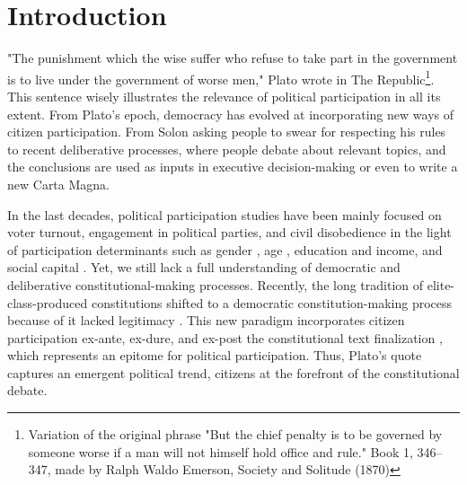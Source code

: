 \documentclass[onecolumn]{article}
\begin{document}


\maketitle

\section*{Introduction}
\label{sec:intro}

"The punishment which the wise suffer who refuse to take part in the government is to live under the government of worse men," Plato wrote in The Republic\footnote{Variation of the original phrase "But the chief penalty is to be governed by someone worse if a man will not himself hold office and rule." Book 1, 346–347, made by Ralph Waldo Emerson, Society and Solitude (1870)}. This sentence wisely illustrates the relevance of political participation in all its extent. From Plato's epoch, democracy has evolved at incorporating new ways of citizen participation. From Solon asking people to swear for respecting his rules to recent deliberative processes, where people debate about relevant topics, and the conclusions are used as inputs in executive decision-making or even to write a new Carta Magna. 

In the last decades, political participation studies have been mainly focused on voter turnout, engagement in political parties, and civil disobedience in the light of participation determinants such as gender \cite{pachon2012, schlozman1999, pnud}, age \cite{wolfinger1980, highton2001, contreras}, education and income\cite{pnud,verba, corvalan}, and social capital \cite{coleman1988, ladua, klesner, bargsted, mccull, campbell, muller1970, hofferth}. Yet, we still lack a full understanding of democratic and deliberative constitutional-making processes. Recently, the long tradition of elite-class-produced constitutions shifted to a democratic constitution-making process because of it lacked legitimacy \cite{usip}. This new paradigm incorporates citizen participation ex-ante, ex-dure, and ex-post the constitutional text finalization \cite{banks2007, ginsburg2009, usip}, which represents an epitome for political participation. Thus, Plato's quote captures an emergent political trend, citizens at the forefront of the constitutional debate. 
\end{document}
